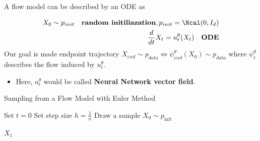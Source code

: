 \documentclass[aspectratio=169,xcolor=dvipsnames,svgnames,x11names,fleqn]{beamer}
\begin{document}
\begin{frame}
    A flow model can be described by an ODE as 

    \begin{align*}
        X_0 \sim p_{init} \quad \textbf{random initiliazation}, p_{init}  = \Ncal(0, I_d)\\
        \frac{d}{dt}X_t = u_t^\theta(X_t) \quad \textbf{ODE}
    \end{align*}
    Our goal is made endpoint trajectory $X_{end} \sim p_{data} \Leftrightarrow \psi_{end}^\theta(X_0) \sim p_{data}$
    where $\psi_t^\theta$ describes the flow induced by $u_t^\theta$.

    \begin{itemize}
        \item Here, $u_t^\theta$ would be called \textbf{Neural Network vector field}.
    \end{itemize}
\end{frame}

\begin{frame}{Sampling from a Flow Model with Euler Method}

\begin{algorithm}[H]
    \caption{\textbf{Sampling from a Flow Model with Euler method}}
    \DontPrintSemicolon
    
    
    Set $t = 0$\;
    Set step size $h = \frac{1}{n}$\;
    Draw a sample $X_0 \sim p_{\text{init}}$\;
    
    
    \KwRet $X_1$\;
\end{algorithm}
    
\end{frame}
\end{document}
